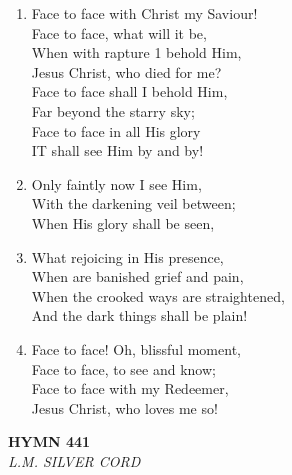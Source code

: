 \documentclass[11pt,a4paper]{article}
\begin{document}
\begin{enumerate}
    \item Face to face with Christ my Saviour! \\
        Face to face, what will it be, \\
        When with rapture 1 behold Him, \\
        Jesus Christ, who died for me? \\
        Face to face shall I behold Him, \\
        Far beyond the starry sky; \\
        Face to face in all His glory \\
        IT shall see Him by and by!

    \item Only faintly now I see Him, \\
        With the darkening veil between; \\
        When His glory shall be seen,

    \item What rejoicing in His presence, \\
        When are banished grief and pain, \\
        When the crooked ways are straightened, \\
        And the dark things shall be plain!

    \item Face to face! Oh, blissful moment, \\
        Face to face, to see and know; \\
        Face to face with my Redeemer, \\
        Jesus Christ, who loves me so!

\end{enumerate}

\newpage
\begin{center}
    {\Large \textbf{HYMN 441}}
    \\
    \textit{L.M. SILVER CORD}
\end{center}
\vspace{1em}
\end{document}
